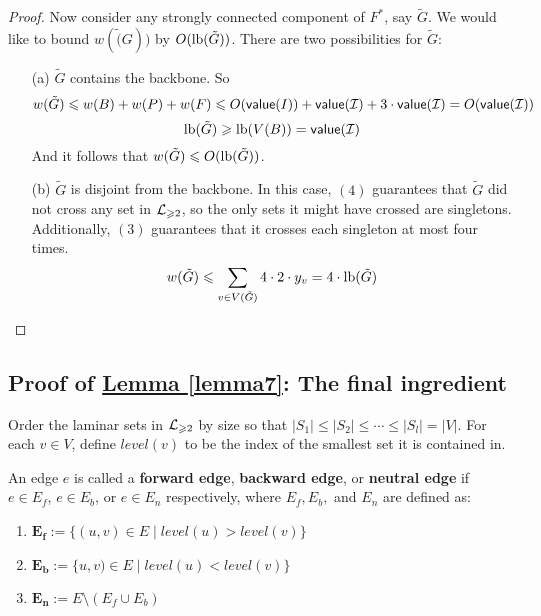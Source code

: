 \documentclass[./main.tex]{subfiles}
\begin{document}
\begin{proof}
			Now consider any strongly connected component of $F^*$, say $\tilde{G}$. We would like to bound $w(\tilde(G))$ by $O(\textup{lb}(\tilde{G}))$. There are two possibilities for $\tilde{G}$:
			\begin{enumerate}
				\item[(a)] $\tilde{G}$ contains the backbone. So $$w(\tilde{G})\leqslant w(B) + w(P) + w(F)\leqslant O(\textsf{\textup{value}}(I)) + \textsf{\textup{value}}(\mathcal{I}) + 3\cdot\textsf{\textup{value}}(\mathcal{I}) = O(\textsf{\textup{value}}(\mathcal{I}))$$
				      $$\textup{lb}(\tilde{G})\geqslant \textup{lb}(V(B)) = \textsf{\textup{value}}(\mathcal{I})$$
				      And it follows that $w(\tilde{G})\leqslant O(\textup{lb}(\tilde{G}))$.
				\item[(b)] $\tilde{G}$ is disjoint from the backbone. In this case, $(4)$ guarantees that $\tilde{G}$ did not cross any set in $\mathcal{L}_{\geqslant 2}$, so the only sets it might have crossed are singletons. Additionally, $(3)$ guarantees that it crosses each singleton at most four times. $$w(\tilde{G})\leqslant \sum_{v\in V(\tilde{G})}4\cdot 2\cdot y_v = 4\cdot\textup{lb}(\tilde{G})$$
			\end{enumerate}
		\end{proof}
		
		\subsection{Proof of \hyperref[lemma7]{Lemma \ref{lemma7}}: The final ingredient}

			Order the laminar sets in $\mathcal{L}_{\geqslant 2}$ by size so that $|S_1|\leqslant |S_2|\leqslant\cdots\leqslant |S_l| = |V|$. For each $v\in V$, define $level(v)$ to be the index of the smallest set it is contained in.\\
			\begin{definition}
				An edge $e$ is called a \textbf{forward edge}, \textbf{backward edge}, or \textbf{neutral edge} if $e\in E_f$, $e\in E_b$, or $e\in E_n$ respectively, where $E_f, E_b,$ and $E_n$ are defined as:
				\begin{enumerate}[$-$]
					\item $\bm{E_f}:=\{(u,v)\in E\mid level(u) > level(v)\}$
					\item $\bm{E_b}:=\{u,v)\in E\mid level(u) < level(v)\}$
					\item $\bm{E_n}:=E\setminus (E_f\cup E_b)$\\
				\end{enumerate}
			\end{definition}
			
\end{document}
